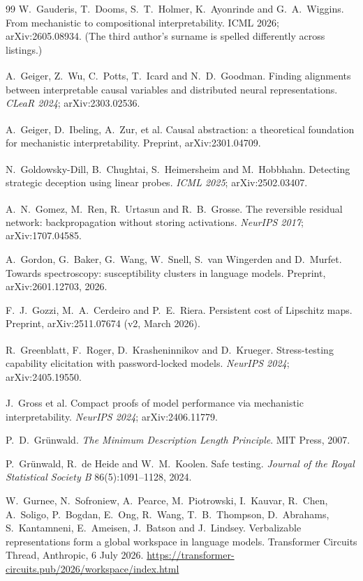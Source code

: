 \documentclass[11pt,a4paper]{article}
\newcommand{\unv}{\textsuperscript{\dag}}
\begin{document}
\begin{thebibliography}{99}
 W.~Gauderis, T.~Dooms, S.~T.~Holmer, K.~Ayonrinde
and G.~A.~Wiggins. From mechanistic to compositional interpretability.
ICML 2026; arXiv:2605.08934. (The third author's surname is spelled
differently across listings.)

\unv{} A.~Geiger, Z.~Wu, C.~Potts, T.~Icard and
N.~D.~Goodman. Finding alignments between interpretable causal variables
and distributed neural representations. \emph{CLeaR 2024};
arXiv:2303.02536.

\unv{} A.~Geiger, D.~Ibeling, A.~Zur, et al. Causal
abstraction: a theoretical foundation for mechanistic interpretability.
Preprint, arXiv:2301.04709.

\unv{} N.~Goldowsky-Dill, B.~Chughtai,
S.~Heimersheim and M.~Hobbhahn. Detecting strategic deception using
linear probes. \emph{ICML 2025}; arXiv:2502.03407.

\unv{} A.~N.~Gomez, M.~Ren, R.~Urtasun and R.~B.~Grosse.
The reversible residual network: backpropagation without storing
activations. \emph{NeurIPS 2017}; arXiv:1707.04585.

 A.~Gordon, G.~Baker, G.~Wang, W.~Snell, S.~van
Wingerden and D.~Murfet. Towards spectroscopy: susceptibility clusters in
language models. Preprint, arXiv:2601.12703, 2026.

 F.~J.~Gozzi, M.~A.~Cerdeiro and P.~E.~Riera. Persistent
cost of Lipschitz maps. Preprint, arXiv:2511.07674 (v2, March 2026).

\unv{} R.~Greenblatt, F.~Roger, D.~Krasheninnikov
and D.~Krueger. Stress-testing capability elicitation with password-locked
models. \emph{NeurIPS 2024}; arXiv:2405.19550.

\unv{} J.~Gross et al. Compact proofs of model
performance via mechanistic interpretability. \emph{NeurIPS 2024};
arXiv:2406.11779.

 P.~D.~Gr\"unwald. \emph{The Minimum Description
Length Principle}. MIT Press, 2007.

 P.~Gr\"unwald, R.~de Heide and W.~M.~Koolen.
Safe testing. \emph{Journal of the Royal Statistical Society B}
86(5):1091--1128, 2024.

 W.~Gurnee, N.~Sofroniew, A.~Pearce,
M.~Piotrowski, I.~Kauvar, R.~Chen, A.~Soligo, P.~Bogdan, E.~Ong, R.~Wang,
T.~B.~Thompson, D.~Abrahams, S.~Kantamneni, E.~Ameisen, J.~Batson and
J.~Lindsey. Verbalizable representations form a global workspace in language
models. Transformer Circuits Thread, Anthropic, 6 July 2026.
\url{https://transformer-circuits.pub/2026/workspace/index.html}


\end{thebibliography}
\end{document}
